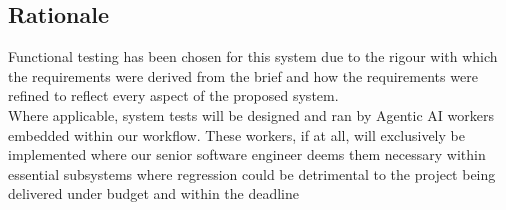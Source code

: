 \documentclass{article}
\begin{document}
\subsection*{Rationale}

Functional testing has been chosen for this system due to the rigour with which the requirements were derived from the brief and how the requirements were refined to reflect every aspect of the proposed system. 
\\
Where applicable, system tests will be designed and ran by Agentic AI workers embedded within our workflow. These workers, if at all, will exclusively be implemented where our senior software engineer deems them necessary within essential subsystems where regression could be detrimental to the project being delivered under budget and within the deadline
\end{document}
